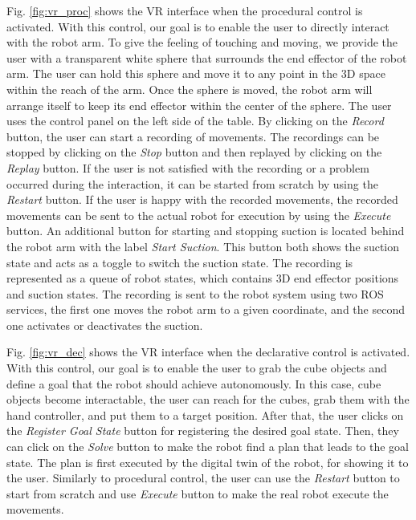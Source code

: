 \documentclass[10pt, conference]{IEEEtran}
\begin{document}
Fig. \ref{fig:vr_proc} shows the VR interface when the procedural control is activated. With this control, our goal is to enable the user to directly interact with the robot arm. To give the feeling of touching and moving, we provide the user with a transparent white sphere that surrounds the end effector of the robot arm. The user can hold this sphere and move it to any point in the 3D space within the reach of the arm. Once the sphere is moved, the robot arm will arrange itself to keep its end effector within the center of the sphere. The user uses the control panel on the left side of the table. By clicking on the \textit{Record} button, the user can start a recording of movements. The recordings can be stopped by clicking on the \textit{Stop} button and then replayed by clicking on the \textit{Replay} button. If the user is not satisfied with the recording or a problem occurred during the interaction,  it can be started from scratch by using the \textit{Restart} button. If the user is happy with the recorded movements, the recorded movements can be sent to the actual robot for execution by using the \textit{Execute} button. An additional button for starting and stopping suction is located behind the robot arm with the label \textit{Start Suction}. This button both shows the suction state and acts as a toggle to switch the suction state. The recording is represented as a queue of robot states, which contains 3D end effector positions and suction states. The recording is sent to the robot system using two ROS services, the first one moves the robot arm to a given coordinate, and the second one activates or deactivates the suction. 

Fig. \ref{fig:vr_dec} shows the VR interface when the declarative control is activated. With this control, our goal is to enable the user to grab the cube objects and define a goal that the robot should achieve autonomously. In this case, cube objects become interactable, the user can reach for the cubes, grab them with the hand controller, and put them to a target position. After that, the user clicks on the \textit{Register Goal State} button for registering the desired goal state. Then, they can click on the \textit{Solve} button to make the robot find a plan that leads to the goal state. The plan is first executed by the digital twin of the robot, for showing it to the user. Similarly to procedural control, the user can use the \textit{Restart} button to start from scratch and use \textit{Execute} button to make the real robot execute the movements.
\end{document}
